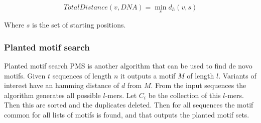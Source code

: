 		$$TotalDistance(v,DNA) = \min\limits_s d_h(v,s)$$

		Where $s$ is the set of starting positions.

		\subsubsection{Planted motif search}
		Planted motif search PMS is another algorithm that can be used to find de novo motifs.
		Given $t$ sequences of length $n$ it outputs a motif $M$ of length $l$.
		Variants of interest have an hamming distance of $d$ from $M$.
		From the input sequences the algorithm generates all possible $l$-mers.
		Let $C_i$ be the collection of this $l$-mers.
		Then this are sorted and the duplicates deleted.
		Then for all sequences the motif common for all lists of motifs is found, and that outputs the planted motif sets.
